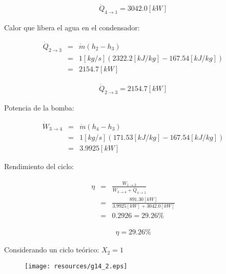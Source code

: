 \documentclass[letter,10pt]{article}
\begin{document}
\begin{enumerate}
\begin{equation*}
\boxed{
    \begin{array}{l}
        \dot{Q}_{4\rightarrow1} = 3042.0[kW]
    \end{array}
}
\end{equation*}

Calor que libera el agua en el condensador:

\begin{eqnarray*}
    \dot{Q}_{2\rightarrow3} &=& \dot{m}(h_2 - h_3) \\
                            &=& 1[kg/s](2322.2[kJ/kg]-167.54[kJ/kg]) \\
                            &=& 2154.7[kW]
\end{eqnarray*}

\begin{equation*}
\boxed{
    \begin{array}{l}
        \dot{Q}_{2\rightarrow3} = 2154.7[kW]
    \end{array}
}
\end{equation*}

Potencia de la bomba:

\begin{eqnarray*}
    \dot{W}_{3\rightarrow4} &=& \dot{m}(h_4 - h_3) \\
                            &=& 1[kg/s](171.53[kJ/kg]-167.54[kJ/kg]) \\
                            &=& 3.9925[kW]
\end{eqnarray*}

Rendimiento del ciclo:

\begin{eqnarray*}
    \eta &=& \frac{\dot{W}_{1\rightarrow2}}
             {\dot{W}_{3\rightarrow4}+\dot{Q}_{4\rightarrow1}} \\
         &=& \frac{891.30[kW]}{3.9925[kW]+3042.0[kW]} \\
         &=& 0.2926 = 29.26\%
\end{eqnarray*}

\begin{equation*}
\boxed{
    \begin{array}{l}
        \eta = 29.26\%
    \end{array}
}
\end{equation*}

Considerando un ciclo teórico: $X_2 = 1$

\begin{figure}[H]
\centering
\texttt{[image: resources/g14\_2.eps]}
\end{figure}


\end{enumerate}
\end{document}
